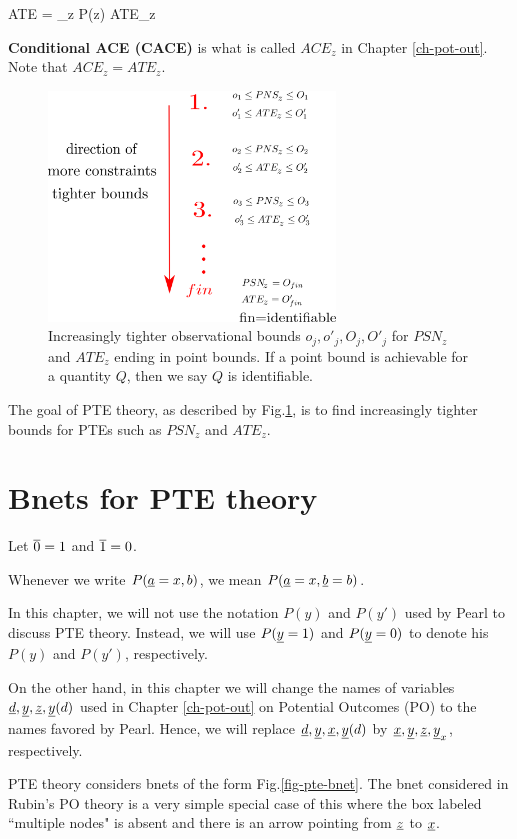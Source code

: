 \beq
ATE = \sum_z P(z) ATE_z
\eeq

{\bf Conditional ACE 
(CACE)} is what
is called
$ACE_z$ in Chapter \ref{ch-pot-out}.
Note that
$ACE_z=ATE_z$.

\begin{figure}[h!]
\centering
\includegraphics[width=3in]
{personalized/personalized-goal.png}
\caption{Increasingly
tighter observational bounds
$o_j, o'_j, O_j, O'_j$ 
for $PSN_z$ and $ATE_z$
ending in point bounds.
If a point bound is achievable
 for a quantity $Q$,
then we say $Q$
is identifiable.} 
\label{fig-personalized-goal}
\end{figure}

The goal of PTE theory, as
described by 
Fig.\ref{fig-personalized-goal}, is
to find
increasingly 
tighter bounds for
PTEs such as 
$PSN_z$ and $ATE_z$.


\section{Bnets for PTE theory}
\quad

Let $\overline{0}=1$ and $\overline{1}=0$.

Whenever we write $P({\underline{a}}=x, b)$, 
we mean $P({\underline{a}}=x, {\underline{b}}=b)$.

In this chapter, we will
not use the notation
$P(y)$ and $P(y')$
used by Pearl to
discuss PTE theory.
Instead, we will
use $P({\underline{y}}=1)$ and
$P({\underline{y}}=0)$
to denote his 
$P(y)$ and $P(y')$, respectively. 


On the other hand, 
in this chapter
we will change the names 
of variables ${\underline{d}}, {\underline{y}}, {\underline{z}}, {\underline{y}}(d)$
used 
in Chapter \ref{ch-pot-out} on Potential
Outcomes (PO)
to the names favored by Pearl.
Hence, we will replace
${\underline{d}}, {\underline{y}}, {\underline{x}}, {\underline{y}}(d)$
by
${\underline{x}}, {\underline{y}}, {\underline{z}}, {\underline{y}}_x$,
respectively.



PTE theory considers bnets of the form
Fig.\ref{fig-pte-bnet}.
The bnet considered in Rubin's
PO theory
is a very simple special case
of this where the box
labeled ``multiple nodes"
is absent and there is an
arrow pointing
from ${\underline{z}}$ to ${\underline{x}}$.


